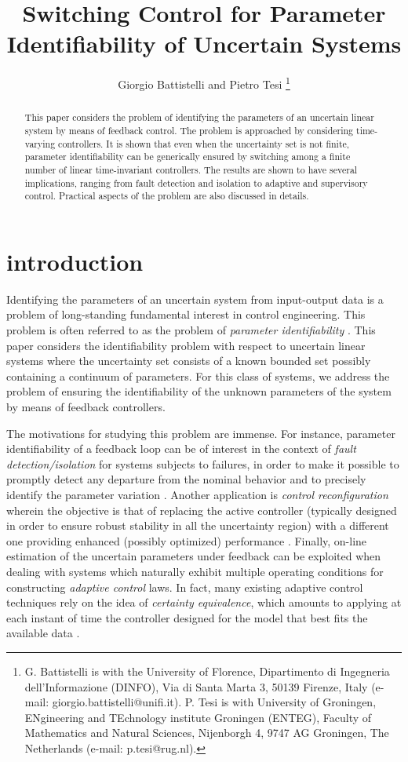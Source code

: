 \documentclass[letterpaper, 10 pt, conference]{ieeetran}
\title{Switching Control for Parameter Identifiability of Uncertain Systems }
\author{Giorgio Battistelli  and Pietro Tesi
\thanks{G. Battistelli is with the
        University of Florence, Dipartimento di Ingegneria dell’Informazione (DINFO), Via di Santa Marta 3, 
        50139 Firenze, Italy (e-mail: giorgio.battistelli@unifi.it).  P. Tesi is with University of Groningen,  
        ENgineering and TEchnology institute Groningen (ENTEG), 
        Faculty of Mathematics and Natural Sciences, Nijenborgh 4, 9747 AG Groningen,
        The Netherlands (e-mail: p.tesi@rug.nl).
       }
}
\begin{document}
\maketitle
\thispagestyle{empty}
\pagestyle{empty}


\begin{abstract}
This paper considers the problem of identifying the parameters of an uncertain 
linear system by means of feedback control. The problem 
is approached by considering time-varying controllers.
It is shown that even when the uncertainty set is not finite, 
parameter identifiability can be generically ensured by 
switching among a finite number of linear time-invariant controllers. 
The results are shown to have several implications, ranging from 
fault detection and isolation to adaptive and supervisory control.
Practical aspects of the problem are also discussed in details.
\end{abstract}


\section{introduction}


Identifying the parameters of an uncertain 
system from input-output data is  
a problem of long-standing fundamental interest in control engineering. 
This problem is often referred to as the problem of \emph{parameter identifiability} 
\cite{Willems,glover}. 
This paper considers the identifiability problem 
with respect to uncertain linear systems where the uncertainty 
set consists of a known bounded set possibly containing 
a continuum of parameters. For this class of systems,
we address the problem of ensuring the identifiability 
of the unknown parameters of the system by means of feedback controllers.

The motivations for studying this problem are immense. For instance, parameter identifiability of a feedback loop can be of interest in
the context of {\em fault detection/isolation} for systems subjects to failures, in order to make it possible to promptly detect any departure from the nominal
behavior and to precisely identify the parameter variation \cite{kinnaert,cocquempot}.
Another application is {\em control reconfiguration} wherein the objective is that
of replacing the active controller (typically designed in order to ensure robust stability in all the uncertainty region) with a different one providing
enhanced (possibly optimized) performance \cite{liberzon,steffen}. Finally, on-line estimation of the uncertain parameters under feedback can be exploited when dealing with systems which naturally exhibit multiple operating conditions  for constructing {\em adaptive control} laws. In fact, many existing adaptive control techniques rely on the idea of \emph{certainty equivalence}, 
which amounts to applying at each instant  of time the controller designed for 
the model that best fits the available data \cite{Astrom,Ioannou}. 
\end{document}
